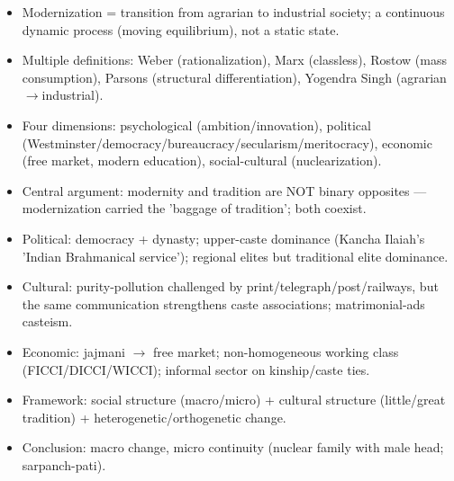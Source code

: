 \begin{QuickRevision}
\begin{itemize}
\item Modernization = transition from agrarian to industrial society; a continuous dynamic process (moving equilibrium), not a static state.
\item Multiple definitions: Weber (rationalization), Marx (classless), Rostow (mass consumption), Parsons (structural differentiation), Yogendra Singh (agrarian$\rightarrow$industrial).
\item Four dimensions: psychological (ambition/innovation), political (Westminster/democracy/bureaucracy/secularism/meritocracy), economic (free market, modern education), social-cultural (nuclearization).
\item Central argument: modernity and tradition are NOT binary opposites --- modernization carried the 'baggage of tradition'; both coexist.
\item Political: democracy + dynasty; upper-caste dominance (Kancha Ilaiah's 'Indian Brahmanical service'); regional elites but traditional elite dominance.
\item Cultural: purity-pollution challenged by print/telegraph/post/railways, but the same communication strengthens caste associations; matrimonial-ads casteism.
\item Economic: jajmani $\rightarrow$ free market; non-homogeneous working class (FICCI/DICCI/WICCI); informal sector on kinship/caste ties.
\item Framework: social structure (macro/micro) + cultural structure (little/great tradition) + heterogenetic/orthogenetic change.
\item Conclusion: macro change, micro continuity (nuclear family with male head; sarpanch-pati).
\end{itemize}
\end{QuickRevision}

